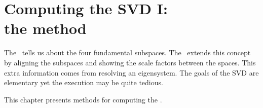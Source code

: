 \chapter[Computing the SVD I]{Computing the SVD I:\\the method}

The \ftola \ tells us about the four fundamental subspaces. The \asvd \ extends this concept by aligning the subspaces and showing the scale factors between the spaces. This extra information comes from resolving an eigensystem. The goals of the SVD are elementary yet the execution may be quite tedious.

This chapter presents methods for computing the \asvd.  





\endinput